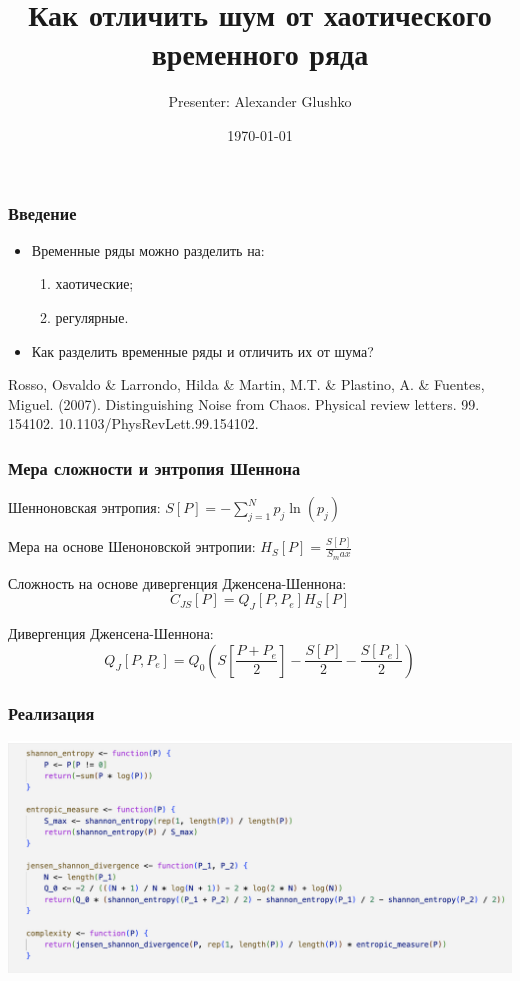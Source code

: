 \documentclass[aspectratio=169]{beamer}
\title[Title]{Как отличить шум от хаотического временного ряда}
\author[Author's name]{Presenter: Alexander Glushko}
\institute{Master's Programme Data Science}
\date{\today}
\begin{document}
\frame[plain]{\titlepage}

\begin{frame}
  \frametitle{Введение}
  \begin{itemize}
    \item Временные ряды можно разделить на:
    \begin{enumerate}
      \item хаотические;
      \item регулярные.
    \end{enumerate}
    \item Как разделить временные ряды и отличить их от шума?
  \end{itemize}
  \bigskip
  Rosso, Osvaldo \& Larrondo, Hilda \& Martin, M.T. \& Plastino, A. \& Fuentes, Miguel. (2007). Distinguishing Noise from Chaos. Physical review letters. 99. 154102. 10.1103/PhysRevLett.99.154102.
\end{frame}

\begin{frame}
  \frametitle{Мера сложности и энтропия Шеннона}
  \medskip

  Шенноновская энтропия: $S[P] = - \sum\limits^N_{j=1}p_j\ln(p_j)$
  
  \medskip 

  Мера на основе Шеноновской энтропии: $H_S[P] = \frac{S[P]}{S_max}$
  
  \bigskip 

  Сложность на основе дивергенция Дженсена-Шеннона: $$C_{JS}[P] = Q_J[P, P_e]H_S[P]$$
  
  \medskip

  Дивергенция Дженсена-Шеннона: $$Q_J[P, P_e] = Q_0 (S\left[ \frac{P + P_e}{2} \right] - \frac{S[P]}{2} - \frac{S[P_e]}{2})$$ 
\end{frame}

\begin{frame}
  \frametitle{Реализация}
  \medskip
  \begin{center}
    \includegraphics[width=0.85\columnwidth]{EntropyFunction.png}
  \end{center}
\end{frame}
\end{document}
